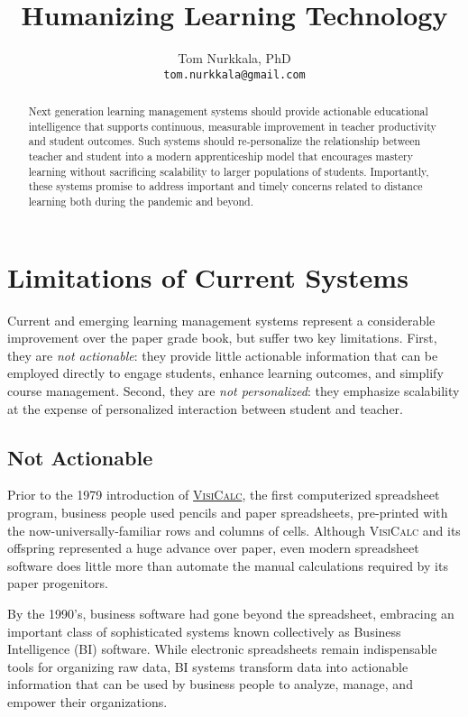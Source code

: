 \documentclass{article}
\title{Humanizing Learning Technology}
\author{Tom Nurkkala, PhD\\\texttt{tom.nurkkala@gmail.com}}
\newcommand{\vcalc}{\textsc{VisiCalc}}
\begin{document}
\maketitle

\begin{abstract}
  Next generation learning management systems
  should provide actionable educational intelligence
  that supports continuous, measurable improvement
  in teacher productivity and student outcomes.
  Such systems
  should re-personalize the relationship
  between teacher and student
  into a modern apprenticeship model
  that encourages mastery learning
  without sacrificing scalability
  to larger populations of students.
  Importantly, these systems promise to
  address important and timely concerns
  related to distance learning
  both during the pandemic and beyond.
\end{abstract}

\section{Limitations of Current Systems}
\label{sec:limitations}

Current and emerging learning management systems
represent a considerable improvement over the paper grade book,
but suffer two key limitations.
First,
they are \emph{not actionable}:
they provide little actionable information
that can be employed directly to engage students,
enhance learning outcomes,
and simplify course management.
Second,
they are \emph{not personalized}:
they emphasize scalability
at the expense of personalized interaction
between student and teacher.

\subsection{Not Actionable}
\label{sec:not-actionable}

Prior to the 1979 introduction
of \href{https://en.wikipedia.org/wiki/VisiCalc}{\vcalc{}},
the first computerized spreadsheet program,
business people used pencils and paper spreadsheets,
pre-printed with the now-universally-familiar rows and columns of cells.
Although \vcalc{} and its offspring
represented a huge advance over paper,
even modern spreadsheet software does little more
than automate the manual calculations
required by its paper progenitors.

By the 1990's, business software had gone beyond the spreadsheet,
embracing an important class of sophisticated systems
known collectively as Business Intelligence (BI) software.
While electronic spreadsheets
remain indispensable tools for organizing raw data,
BI systems transform data into actionable information
that can be used by business people
to analyze, manage, and empower their organizations.
\end{document}
